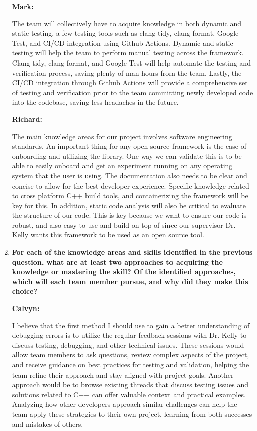 \documentclass[12pt, titlepage]{article}
\begin{document}
\begin{enumerate}
    

    \textbf{Mark:}
    
     The team will collectively have to acquire knowledge in both dynamic and static testing, a few testing tools such as clang-tidy, clang-format, Google Test, and CI/CD integration using Github Actions. Dynamic and static testing will help the team to perform manual testing across the framework. Clang-tidy, clang-format, and Google Test will help automate the testing and verification process, saving plenty of man hours from the team. Lastly, the CI/CD integration through Github Actions will provide a comprehensive set of testing and verification prior to the team committing newly developed code into the codebase, saving less headaches in the future.

    

    \textbf{Richard:}

     The main knowledge areas for our project involves software engineering standards. An important thing for any open source framework is the ease of onboarding and utilizing the library. One way we can validate this is to be able to easily onboard and get an experiment running on any operating system that the user is using. The documentation also needs to be clear and concise to allow for the best developer experience. Specific knowledge related to cross platform C++ build tools, and containerizing the framework will be key for this. In addition, static code analysis will also be critical to evaluate the structure of our code. This is key because we want to ensure our code is robust, and also easy to use and build on top of since our supervisor Dr. Kelly wants this framework to be used as an open source tool.

    



  \item \textbf{For each of the knowledge areas and skills identified in the previous
  question, what are at least two approaches to acquiring the knowledge or
  mastering the skill?  Of the identified approaches, which will each team
  member pursue, and why did they make this choice?}


  \textbf{Calvyn:}

  I believe that the first method I should use to gain a better understanding of debugging errors is to utilize the regular feedback sessions with Dr. Kelly to discuss testing, debugging, and other technical issues. These sessions would allow team members to ask questions, review complex aspects of the project, and receive guidance on best practices for testing and validation, helping the team refine their approach and stay aligned with project goals. Another approach would be to browse existing threads that discuss testing issues and solutions related to C++ can offer valuable context and practical examples. Analyzing how other developers approach similar challenges can help the team apply these strategies to their own project, learning from both successes and mistakes of others.


\end{enumerate}
\end{document}
